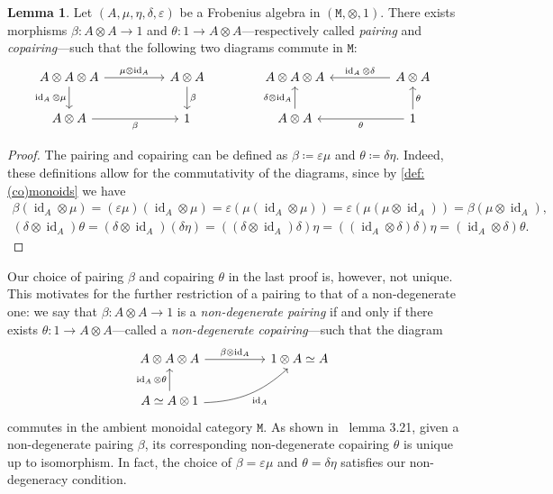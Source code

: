\documentclass[11pt, reqno]{amsart}
\theoremstyle{definition}
\newtheorem{lemma}[theorem]{Lemma}
\newcommand{\iso}{\simeq}
\newcommand{\cat}{\texttt}
\DeclareMathOperator{\Id}{id}     %
\begin{document}
\begin{lemma}
\label{lem:(co)pairing-frobenius-algebra}
Let \((A, \mu, \eta, \delta, \varepsilon)\) be a Frobenius algebra in \((\cat M,
\otimes, 1)\). There exists morphisms \(\beta: A \otimes A \to 1\) and \(\theta:
1 \to A \otimes A\)---respectively called \emph{pairing} and
\emph{copairing}---such that the following two diagrams commute in \(\cat M\):
\[
\begin{tikzcd}
A \otimes A \otimes A
\ar[rr, "\mu \otimes \Id_A"]
\ar[d, "\Id_A \otimes \mu"']
& &A \otimes A \ar[d, "\beta"]
\\
A \otimes A \ar[rr, "\beta"']
& &1
\end{tikzcd}
\qquad
\qquad
\begin{tikzcd}
A \otimes A \otimes A
& &A \otimes A
\ar[ll, "\Id_A \otimes \delta"']
\\
A \otimes A \ar[u, "\delta \otimes \Id_A"]
& &1 \ar[ll, "\theta"] \ar[u, "\theta"']
\end{tikzcd}
\]
\end{lemma}

\begin{proof}
The pairing and copairing can be defined as \(\beta \coloneq \varepsilon \mu\)
and \(\theta \coloneq \delta \eta\). Indeed, these definitions allow for the
commutativity of the diagrams, since by \cref{def:(co)monoids} we have
\begin{gather*}
\beta (\Id_A \otimes \mu)
= (\varepsilon \mu) (\Id_A \otimes \mu)
= \varepsilon (\mu (\Id_A \otimes \mu))
= \varepsilon (\mu (\mu \otimes \Id_A))
= \beta (\mu \otimes \Id_A),
\\
(\delta \otimes \Id_A) \theta
= (\delta \otimes \Id_A) (\delta \eta)
= ((\delta \otimes \Id_A) \delta) \eta
= ((\Id_A \otimes \delta) \delta) \eta
= (\Id_A \otimes \delta) \theta.
\end{gather*}
\end{proof}

Our choice of pairing \(\beta\) and copairing \(\theta\) in the last proof is,
however, not unique. This motivates for the further restriction of a pairing to
that of a non-degenerate one: we say that \(\beta: A \otimes A \to 1\) is a
\emph{non-degenerate pairing} if and only if there exists
\(\theta: 1 \to A \otimes A\)---called a \emph{non-degenerate copairing}---such
that the diagram
\begin{equation}\label{eq:non-degenerate-pairing}
\begin{tikzcd}
A \otimes A \otimes A \ar[rr, "\beta \otimes \Id_A"]
& &1 \otimes A \iso A
\\
A \iso A \otimes 1 \ar[u, "\Id_A \otimes \theta"]
\ar[rru, bend right=20, "\Id_A"']
& &
\end{tikzcd}
\end{equation}
commutes in the ambient monoidal category \(\cat M\). As shown in~\cite{geiger}
lemma 3.21, given a non-degenerate pairing \(\beta\), its corresponding
non-degenerate copairing \(\theta\) is unique up to isomorphism. In fact, the
choice of \(\beta = \varepsilon \mu\) and \(\theta = \delta \eta\) satisfies
our non-degeneracy condition.
\end{document}
